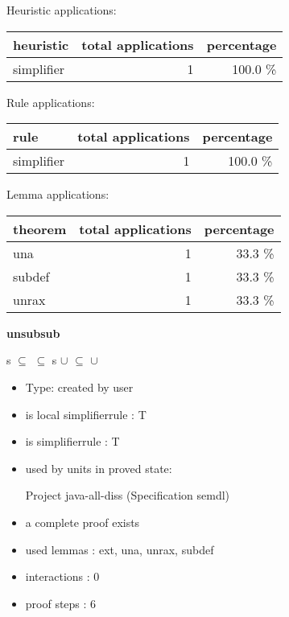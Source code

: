 \documentclass[a4paper]{article}
\begin{document}
\medskip


Heuristic applications:

\begin{supertabular}{l|r|r}
heuristic	& total applications & percentage \\ \hline
simplifier & 1 & 100.0 \% \\

\end{supertabular}

Rule applications:

\begin{supertabular}{l|r|r}
rule	        & total applications & percentage \\ \hline
simplifier & 1 & 100.0 \% \\

\end{supertabular}

Lemma applications:

\begin{supertabular}{l|r|r}
theorem	        & total applications & percentage \\ \hline
una & 1 & 33.3 \% \\
subdef & 1 & 33.3 \% \\
unrax & 1 & 33.3 \% \\

\end{supertabular}
\pagebreak

{\LARGE\bf unsubsub}\label{lemma-unsubsub}

\medskip

 \Fol s $\subseteq$  \And {} $\subseteq$  \Imp s $\cup$  $\subseteq$  $\cup$ 

\begin{itemize}

\item Type: created by user

\item is local simplifierrule : T
\item is simplifierrule : T
\item used by units in proved state:

Project java-all-diss (Specification semdl)
\item       a complete proof exists
\item       used lemmas  : ext, una, unrax, subdef
\item       interactions : 0
\item       proof steps  : 6
\end{itemize}
\end{document}
